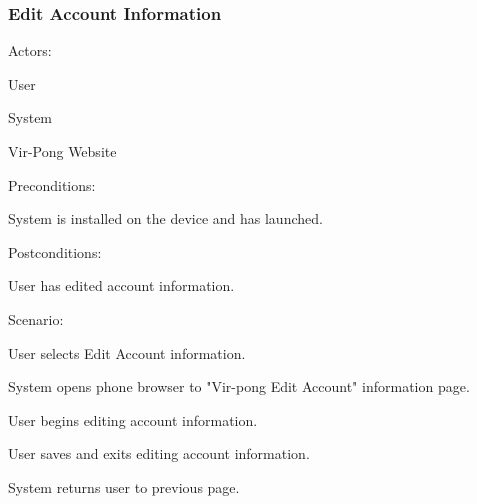 \documentclass[12pt]{article}
\newenvironment{itemize*}%
  {\begin{itemize}%
  	\setlength{\parsep}{0pt}
    \setlength{\itemsep}{0pt}%
    \setlength{\parskip}{0pt}}%
  {\end{itemize}}
\newenvironment{enumerate*}%
  {\begin{enumerate}%
  	\setlength{\parsep}{0pt}
    \setlength{\itemsep}{0pt}%
    \setlength{\parskip}{0pt}}%
  {\end{enumerate}}
\begin{document}
\subsubsection*{Edit Account Information}
Actors:
\begin{itemize*}
\item User
\item System
\item Vir-Pong Website
\end{itemize*}
Preconditions:
\begin{itemize*}
\item System is installed on the device and has launched.
\end{itemize*}
Postconditions:
\begin{itemize*}
\item User has edited account information.
\end{itemize*}
Scenario:
\begin{enumerate*}
\item User selects Edit Account information.
\item \label{Browser}System opens phone browser to "Vir-pong Edit Account" information page. 
\item User begins editing account information.
\item User saves and exits editing account information.
\item System returns user to previous page.
\end{enumerate*} 

\onehalfspacing


\end{document}
